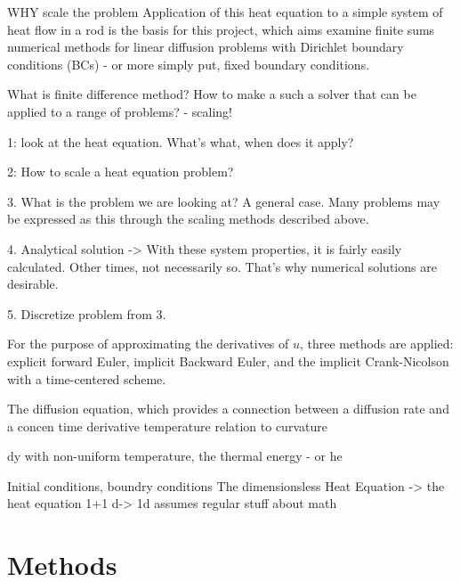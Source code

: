 \documentclass[%
oneside,                 %
final,                   %
10pt]{article}
\begin{document}
WHY scale the problem
Application of this heat equation to a simple system of heat flow in a rod is the basis for this project, which aims examine finite sums numerical methods for linear diffusion problems with Dirichlet boundary conditions (BCs) - or more simply put, fixed boundary conditions. \newline

What is finite difference method? How to make a such a solver that can be applied to a range of problems? - scaling!

 
1: look at the heat equation. What's what, when does it apply? \newline

2: How to scale a heat equation problem? \newline
 
3. What is the problem we are looking at? A general case. Many problems may be expressed as this through the scaling methods described above.  \newline
 
4. Analytical solution -> With these system properties, it is fairly easily calculated. Other times, not necessarily so. That's why numerical solutions are desirable.  \newline

5. Discretize problem from 3. \newline
 

For the purpose of approximating the derivatives of $u$, three methods are applied: explicit forward Euler, implicit Backward Euler, and the implicit Crank-Nicolson with a time-centered scheme.



The diffusion equation, which provides a connection between a diffusion rate and a concen time derivative temperature relation to curvature

dy with non-uniform temperature, the thermal energy - or he


Initial conditions, boundry conditions \newline
The dimensionsless Heat Equation -> the heat equation
1+1 d-> 1d
assumes regular stuff about math


\section{Methods}
\end{document}
